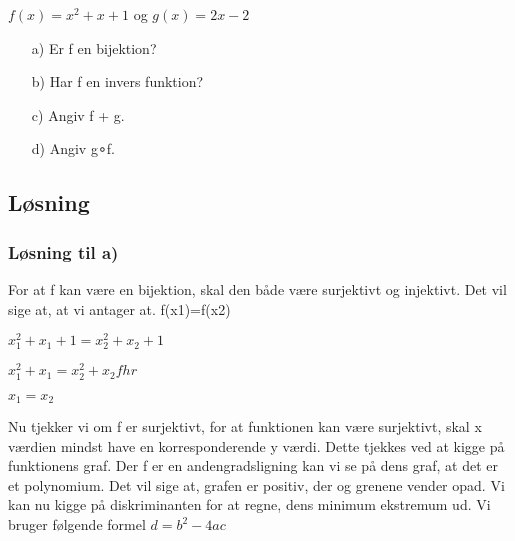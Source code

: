 \documentclass[12pt]{article}
\begin{document}
\vspace{0.25in}
 
\begin{math}f(x) = x^2 + x + 1 \end{math} og
\begin{math}g(x) = 2x - 2 \end{math}

\begin{enumerate}[label=\alph*)] %
\item[a)] Er f en bijektion?
\item[b)] Har f en invers funktion? 
\item[c)] Angiv f + g. 
\item[d)] Angiv g∘f.
\end{enumerate}



\subsection{Løsning}
\subsubsection{Løsning til a)}

\text For at f kan være en bijektion, skal den både være surjektivt og injektivt. 
\text Det vil sige at, at vi antager at.
f(x1)=f(x2)

\begin{math} x_1^2 + x_1+ 1 =x_2^2 + x_2+ 1 \end{math}



\begin{math} x_1^2 + x_1 =x_2^2 + x_2 fhr\end{math}



\begin{math} x_1=x_2\end{math}


Nu tjekker vi om f er surjektivt, for at funktionen kan være surjektivt, skal x værdien mindst have en korresponderende y værdi. Dette tjekkes ved at kigge på funktionens graf. Der f er en andengradsligning kan vi se på dens graf, at det er et polynomium. Det vil sige at, grafen er positiv, der og grenene vender opad. Vi kan nu kigge på diskriminanten for at regne, dens minimum ekstremum ud. Vi bruger følgende formel \begin{math} d=b^2-4ac\end{math}
\end{document}
